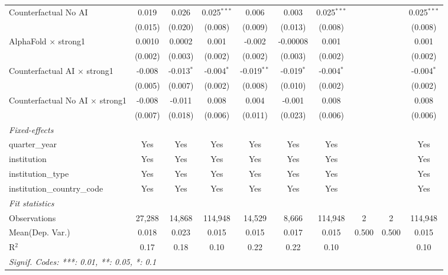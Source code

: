 \begin{tabular}{lccccccccc}
   Counterfactual No AI                   & 0.019   & 0.026        & 0.025$^{***}$ & 0.006         & 0.003        & 0.025$^{***}$ &     &     & 0.025$^{***}$\\   
                                          & (0.015) & (0.020)      & (0.008)       & (0.009)       & (0.013)      & (0.008)       &     &     & (0.008)\\   
   AlphaFold $\times$ strong1             & 0.0010  & 0.0002       & 0.001         & -0.002        & -0.00008     & 0.001         &     &     & 0.001\\   
                                          & (0.002) & (0.003)      & (0.002)       & (0.002)       & (0.003)      & (0.002)       &     &     & (0.002)\\   
   Counterfactual AI $\times$ strong1     & -0.008  & -0.013$^{*}$ & -0.004$^{*}$  & -0.019$^{**}$ & -0.019$^{*}$ & -0.004$^{*}$  &     &     & -0.004$^{*}$\\   
                                          & (0.005) & (0.007)      & (0.002)       & (0.008)       & (0.010)      & (0.002)       &     &     & (0.002)\\   
   Counterfactual No AI $\times$ strong1  & -0.008  & -0.011       & 0.008         & 0.004         & -0.001       & 0.008         &     &     & 0.008\\   
                                          & (0.007) & (0.018)      & (0.006)       & (0.011)       & (0.023)      & (0.006)       &     &     & (0.006)\\   
   \midrule
   \emph{Fixed-effects}\\
   quarter\_year                          & Yes     & Yes          & Yes           & Yes           & Yes          & Yes           &     &     & Yes\\  
   institution                            & Yes     & Yes          & Yes           & Yes           & Yes          & Yes           &     &     & Yes\\  
   institution\_type                      & Yes     & Yes          & Yes           & Yes           & Yes          & Yes           &     &     & Yes\\  
   institution\_country\_code             & Yes     & Yes          & Yes           & Yes           & Yes          & Yes           &     &     & Yes\\  
   \midrule
   \emph{Fit statistics}\\
   Observations                           & 27,288  & 14,868       & 114,948       & 14,529        & 8,666        & 114,948       & 2   & 2   & 114,948\\  
Mean(Dep. Var.) & 0.018 & 0.023 & 0.015 & 0.015 & 0.017 & 0.015 & 0.500 & 0.500 & 0.015 \\
   R$^2$                                  & 0.17    & 0.18         & 0.10          & 0.22          & 0.22         & 0.10          &     &     & 0.10\\  
   \midrule \midrule
   \multicolumn{10}{l}{\emph{Signif. Codes: ***: 0.01, **: 0.05, *: 0.1}}\\
\end{tabular}
\par\endgroup
